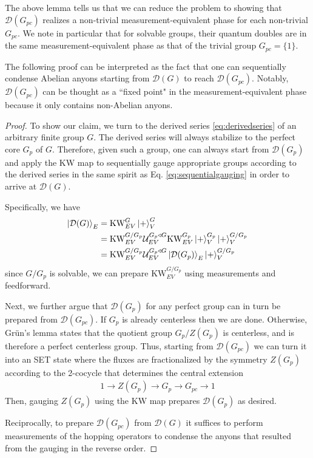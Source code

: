 \documentclass[nofootinbib,prx,twocolumn,showpacs,superscriptaddress,notitlepage,amsmath,amssymb]{revtex4-2}
\theoremstyle{definition}
\def\KW{\text{KW}}
\def\ket#1{\mathinner{|{#1}\rangle}}
\begin{document}
The above lemma tells us that we can reduce the problem to showing that $\mathcal D(G_{pc})$ realizes a non-trivial measurement-equivalent phase for each non-trivial $G_{pc}$. We note in particular that for solvable groups, their quantum doubles are in the same measurement-equivalent phase as that of the trivial group $G_{pc} = \{ 1 \} $. 

The following proof can be interpreted as the fact that one can sequentially condense Abelian anyons starting from $\mathcal D(G)$ to reach $\mathcal D(G_{pc})$. Notably, $\mathcal D(G_{pc})$ can be thought as a ``fixed point" in the measurement-equivalent phase because it only contains non-Abelian anyons.


\begin{proof}
To show our claim, we turn to the derived series \eqref{eq:derivedseries} of an arbitrary finite group $G$. The derived series will always stabilize to the perfect core $G_p$ of $G$. Therefore, given such a group, one can always start from $\mathcal D(G_p)$ and apply the KW map to sequentially gauge appropriate groups according to the derived series in the same spirit as Eq. \eqref{eq:sequentialgauging} in order to arrive at $\mathcal D(G)$.

Specifically, we have
\begin{align}
\ket{\mathcal D(G)}_E  &= \KW^{G}_{EV} \ket{+}^{G}_V \\
&=  \KW^{G/G_p}_{EV} \mathcal U^{G_p \triangleleft G}_{EV} \KW^{G_p}_{EV}\ket{+}^{G_p}_V \ket{+}^{G/G_p}_V  \\
&= \KW^{G/G_p}_{EV} \mathcal U^{G_p \triangleleft G}_{EV} \ket{\mathcal D(G_p)}_E\ket{+}^{G/G_p}_V
\end{align}
since $G/G_p$ is solvable, we can prepare $\KW^{G/G_p}_{EV}$ using measurements and feedforward.

Next, we further argue that $\mathcal D(G_p)$ for any perfect group can in turn be prepared from $\mathcal D(G_{pc})$. If $G_p$ is already centerless then we are done. Otherwise, Gr\"un's lemma states that the quotient group $G_p/Z(G_p)$ is centerless, and is therefore a perfect centerless group. Thus, starting from $\mathcal D(G_{pc})$ we can turn it into an SET state where the fluxes are fractionalized by the symmetry $Z(G_p)$ according to the 2-cocycle that determines the central extension
\begin{align}
 1 \rightarrow Z(G_p)  \rightarrow G_p \rightarrow G_{pc} \rightarrow 1
\end{align}
Then, gauging $Z(G_p)$ using the KW map prepares $\mathcal D(G_{p})$ as desired.

Reciprocally, to prepare $\mathcal D(G_{pc})$ from $\mathcal D(G)$ it suffices to perform measurements of the hopping operators to condense the anyons that resulted from the gauging in the reverse order.
\end{proof}
\end{document}
